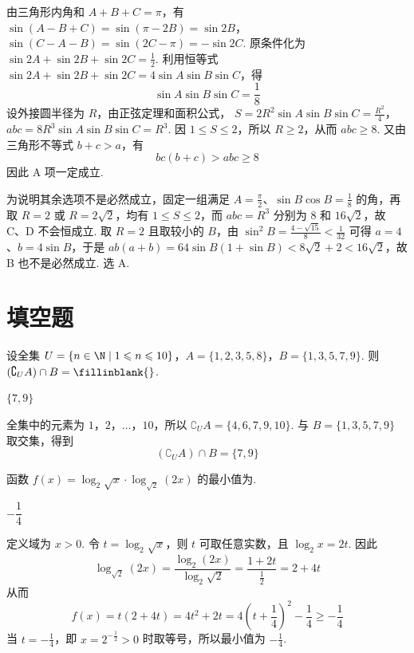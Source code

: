 \begin{solution}
由三角形内角和 \(A+B+C=\pi\)，有
\(\sin(A-B+C)=\sin(\pi-2B)=\sin2B\)，\(\sin(C-A-B)=\sin(2C-\pi)=-\sin2C\).
原条件化为 \(\sin2A+\sin2B+\sin2C=\frac{1}{2}\). 利用恒等式
\(\sin2A+\sin2B+\sin2C=4\sin A\sin B\sin C\)，得
\[
\sin A\sin B\sin C=\frac{1}{8}
\]
设外接圆半径为 \(R\)，由正弦定理和面积公式，
\(S=2R^{2}\sin A\sin B\sin C=\frac{R^{2}}{4}\)，\(abc=8R^{3}\sin A\sin B\sin C=R^{3}\).
因 \(1\leqslant S\leqslant2\)，所以 \(R\geqslant2\)，从而 \(abc\geqslant8\). 又由三角形不等式 \(b+c>a\)，有
\[
bc(b+c)>abc\geqslant8
\]
因此 A 项一定成立.

为说明其余选项不是必然成立，固定一组满足 \(A=\frac{\pi}{2}\)、\(\sin B\cos B=\frac18\) 的角，再取 \(R=2\) 或 \(R=2\sqrt2\)，均有 \(1\leqslant S\leqslant2\)，而 \(abc=R^{3}\) 分别为 \(8\) 和 \(16\sqrt2\)，故 C、D 不会恒成立. 取 \(R=2\) 且取较小的 \(B\)，由 \(\sin^{2}B=\frac{4-\sqrt{15}}{8}<\frac{1}{32}\) 可得 \(a=4\)、\(b=4\sin B\)，于是
\(ab(a+b)=64\sin B(1+\sin B)<8\sqrt2+2<16\sqrt2\)，故 B 也不是必然成立. 选 A.
\end{solution}

\section{填空题}

\begin{problem}
设全集 \(U = \{n \in \N \mid 1 \leqslant n \leqslant 10\}\)，\(A = \{1, 2, 3, 5, 8\}\)，\(B = \{1, 3, 5, 7, 9\}\). 则 \((\complement_U A) \cap B =\fillinblank{}\).
\end{problem}

\begin{answer}
\(\{7, 9\}\)
\end{answer}

\begin{solution}
全集中的元素为 \(1\)，\(2\)，\(\ldots\)，\(10\)，所以 \(\complement_U A=\{4,6,7,9,10\}\). 与 \(B=\{1,3,5,7,9\}\) 取交集，得到
\[
(\complement_U A)\cap B=\{7,9\}
\]
\end{solution}

\begin{problem}
函数 \( f(x) = \log_{2}\sqrt{x} \cdot \log_{\sqrt{2}}(2x) \) 的最小值为\fillinblank{}.
\end{problem}

\begin{answer}
\(-\dfrac{1}{4}\)
\end{answer}

\begin{solution}
定义域为 \(x>0\). 令 \(t=\log_{2}\sqrt{x}\)，则 \(t\) 可取任意实数，且 \(\log_{2}x=2t\). 因此
\[
\log_{\sqrt{2}}(2x)=\frac{\log_{2}(2x)}{\log_{2}\sqrt{2}}=\frac{1+2t}{\frac{1}{2}}=2+4t
\]
从而
\[
f(x)=t(2+4t)=4t^{2}+2t=4\left(t+\frac{1}{4}\right)^{2}-\frac{1}{4}\geqslant-\frac{1}{4}
\]
当 \(t=-\frac14\)，即 \(x=2^{-\frac{1}{2}}>0\) 时取等号，所以最小值为 \(-\frac14\).
\end{solution}

